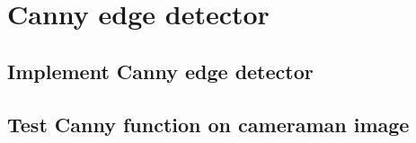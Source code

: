 \documentclass[abstract=true]{scrartcl}
\begin{document}


\section{Canny edge detector}

    \subsection{Implement Canny edge detector}

    \subsection{Test Canny function on cameraman image}


\end{document}
